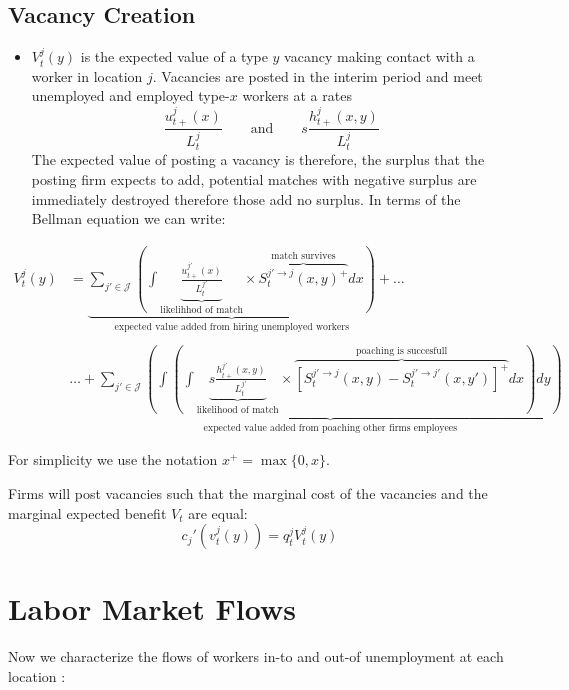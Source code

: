 \documentclass[
  letterpaper,
  DIV=11,
  numbers=noendperiod]{scrreprt}
\providecommand{\tightlist}{%
  \setlength{\itemsep}{0pt}\setlength{\parskip}{0pt}}\usepackage{longtable,booktabs,array}
\begin{document}
\hypertarget{vacancy-creation}{%
\subsection{Vacancy Creation}\label{vacancy-creation}}

\begin{itemize}
\tightlist
\item
  \(V^j_t(y)\) is the expected value of a type \(y\) vacancy making
  contact with a worker in location \(j\). Vacancies are posted in the
  interim period and meet unemployed and employed type-\(x\) workers at
  a rates
  \[\frac{u^j_{t+}(x)}{L^j_t} \qquad \text{and} \qquad s\frac{h^j_{t+}(x,y)}{L^j_t}\]
  The expected value of posting a vacancy is therefore, the surplus that
  the posting firm expects to add, potential matches with negative
  surplus are immediately destroyed therefore those add no surplus. In
  terms of the Bellman equation we can write:
\end{itemize}

\begin{align}
V^j_t(y) &= \underbrace{\sum_{j'\in \mathcal{J}}\left( \int\underbrace{\frac{u^{j'}_{t+}(x)}{L^{j'}_t}}_{\text{likelihhod of match}}\times\overbrace{  S_t^{j'\to j}(x,y)^{+} }^{\text{match survives}}dx\right)}_{\text{expected value added from hiring unemployed workers}} + \ldots\\
&\\
&\ldots +\underbrace{\sum_{j'\in \mathcal{J}}\left(\int \left(\int\underbrace{s\frac{h^{j'}_{t+}(x,y)}{L^{j'}_t}}_{\text{likelihood of match}}\times \overbrace{ [S^{j' \to j}_t(x,y)-S^{j' \to j'}_{t}(x,y')]^{+}}^{\text{poaching is succesfull}}dx\right)dy\right)}_{\text{expected value added from poaching other firms employees}}
\end{align}

For simplicity we use the notation \(x^+ = \max\{0,x\}\).

Firms will post vacancies such that the marginal cost of the vacancies
and the marginal expected benefit \(V_t\) are equal:
\[c_{j}'(v^{j}_t(y))=q^{j}_{t}V^{j}_{t}(y)\]

\hypertarget{labor-market-flows}{%
\section{Labor Market Flows}\label{labor-market-flows}}

Now we characterize the flows of workers in-to and out-of unemployment
at each location :
\end{document}
